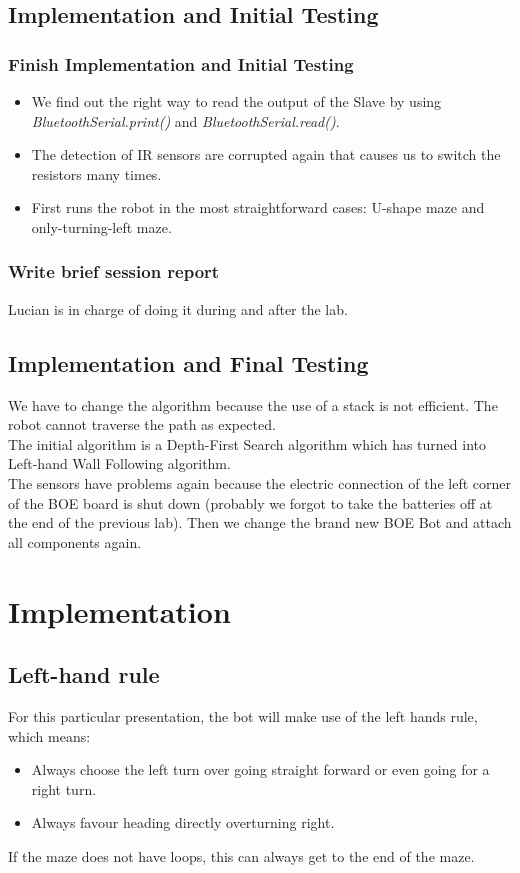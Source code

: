 \documentclass{article}
\begin{document}
\subsection{Implementation and Initial Testing}
\subsubsection{Finish Implementation and Initial Testing}
\begin{itemize}
	\item We find out the right way to read the output of the Slave by using \textit{BluetoothSerial.print()} and \textit{BluetoothSerial.read()}.
	\item The detection of IR sensors are corrupted again that causes us to switch the resistors many times.
	\item First runs the robot in the most straightforward cases: U-shape maze and only-turning-left maze.
\end{itemize}
\subsubsection{Write brief session report}
Lucian is in charge of doing it during and after the lab.

\subsection{Implementation and Final Testing}
We have to change the algorithm because the use of a stack is not efficient. The robot cannot traverse the path as expected.\\
The initial algorithm is a Depth-First Search algorithm which has turned into Left-hand Wall Following algorithm.\\
The sensors have problems again because the electric connection of the left corner of the BOE board is shut down (probably we forgot to take the batteries off at the end of the previous lab). Then we change the brand new BOE Bot and attach all components again.
\newpage
\section{Implementation}
\subsection{Left-hand rule}
For this particular presentation, the bot will make use of the left hands rule, which means:
\begin{itemize}
	\item Always choose the left turn over going straight forward or even going for a right turn.
	\item  Always favour heading directly overturning right.
\end{itemize}
If the maze does not have loops, this can always get to the end of the maze.
 
\end{document}
